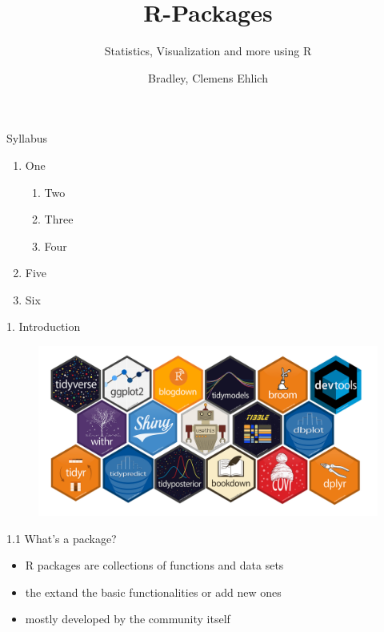 \documentclass[11pt,a4paper]{beamer}
\author{Bradley, Clemens Ehlich}
\title[Short Title]{R-Packages}
\subtitle{Statistics, Visualization and more using R}
\institute{NAWI PLUS}
\date{}
\begin{document}
	

	\begin{frame}
		\titlepage
	\end{frame}


	\begin{frame}[t]{Syllabus}
	
		\begin{enumerate}
			\item One
			\begin{enumerate}
				\item Two
				\item Three
				\item Four
			\end{enumerate}
			\item Five
			\item Six
		\end{enumerate}
		
	\end{frame}



\begin{frame}[t]{1. Introduction}
	

\begin{figure}
	\centering
	\includegraphics[width=0.9\linewidth]{packages}
	\label{fig:packages}
\end{figure}

	
\end{frame}










	
	\begin{frame}[t]{1.1 What's a package?}
				
		\begin{itemize}
			\item R packages are collections of functions and data sets  
			\item the extand the basic functionalities or add new ones
			\item mostly developed by the community itself 
			
			
		\end{itemize}
		
	\end{frame}
	
\end{document}

